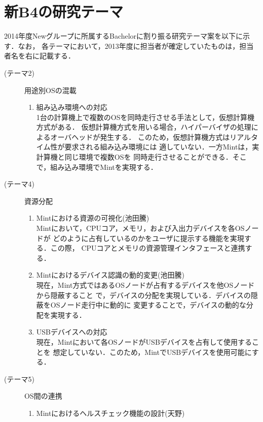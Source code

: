 \documentclass[12pt]{jsarticle}
\begin{document}
\section{新B4の研究テーマ}
2014年度Newグループに所属するBachelorに割り振る研究テーマ案を以下に示す．なお，
各テーマにおいて，2013年度に担当者が確定していたものは，担当者名を右に記載する．
\begin{description}
    \item[(テーマ2)]用途別OSの混載
        \begin{enumerate}
            \item 組み込み環境への対応\\
                1台の計算機上で複数のOSを同時走行させる手法として，仮想計算機方式がある．
                仮想計算機方式を用いる場合，ハイパーバイザの処理によるオーバヘッドが発生する．
                このため，仮想計算機方式はリアルタイム性が要求される組み込み環境には
                適していない．一方Mintは，実計算機と同じ環境で複数OSを
                同時走行させることができる．そこで，組み込み環境でMintを実現する．
        \end{enumerate}
    \item[(テーマ4)]資源分配
        \begin{enumerate}
            \item Mintにおける資源の可視化(池田騰)\\
                Mintにおいて，CPUコア，メモリ，および入出力デバイスを各OSノードが
                どのように占有しているのかをユーザに提示する機能を実現する．この際，
                CPUコアとメモリの資源管理インタフェースと連携する．
            \item Mintにおけるデバイス認識の動的変更(池田騰)\\
                現在，Mint方式ではあるOSノードが占有するデバイスを他OSノードから隠蔽すること
                で，デバイスの分配を実現している．デバイスの隠蔽をOSノード走行中に動的に
                変更することで，デバイスの動的な分配を実現する．
            \item USBデバイスへの対応\\
                現在，Mintにおいて各OSノードがUSBデバイスを占有して使用することを
                想定していない．このため，MintでUSBデバイスを使用可能にする．
        \end{enumerate}
    \item[(テーマ5)]OS間の連携
        \begin{enumerate}
            \item Mintにおけるヘルスチェック機能の設計(天野)\\

\end{enumerate}
\end{description}
\end{document}
